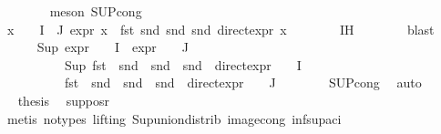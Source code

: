 \begin{isabellebody}
\ \ \ \ \ \ \isamarkupfalse%
\ {\isacharparenleft}{\kern0pt}meson\ SUP{\isacharunderscore}{\kern0pt}cong{\isacharparenright}{\kern0pt}\isanewline
\ \ \ \ \isamarkupfalse%
\ {\isachardoublequoteopen}{\isasymforall}x\ {\isasymin}\ {\isasymPhi}\ {\isacharbackquote}{\kern0pt}\ {\isacharparenleft}{\kern0pt}I\ {\isasymunion}\ J{\isacharparenright}{\kern0pt}{\isachardot}{\kern0pt}\ expr{\isacharunderscore}{\kern0pt}{}\ x\ {\isacharequal}{\kern0pt}\ fst\ {\isacharparenleft}{\kern0pt}snd\ {\isacharparenleft}{\kern0pt}snd\ {\isacharparenleft}{\kern0pt}snd\ {\isacharparenleft}{\kern0pt}direct{\isacharunderscore}{\kern0pt}expr\ x{\isacharparenright}{\kern0pt}{\isacharparenright}{\kern0pt}{\isacharparenright}{\kern0pt}{\isacharparenright}{\kern0pt}{\isachardoublequoteclose}\isanewline
\ \ \ \ \ \ \isamarkupfalse%
\ IH\isanewline
\ \ \ \ \ \ \isamarkupfalse%
\ blast{\isacharplus}{\kern0pt}\isanewline
\ \ \ \ \isamarkupfalse%
\ {\isachardoublequoteopen}Sup\ {\isacharparenleft}{\kern0pt}{\isacharparenleft}{\kern0pt}expr{\isacharunderscore}{\kern0pt}{}\ {\isasymcirc}\ {\isasymPhi}{\isacharparenright}{\kern0pt}\ {\isacharbackquote}{\kern0pt}\ I\ {\isasymunion}\ {\isacharparenleft}{\kern0pt}expr{\isacharunderscore}{\kern0pt}{}\ {\isasymcirc}\ {\isasymPhi}{\isacharparenright}{\kern0pt}\ {\isacharbackquote}{\kern0pt}\ J{\isacharparenright}{\kern0pt}\ {\isacharequal}{\kern0pt}\ \isanewline
\ \ \ \ \ \ \ \ \ \ Sup\ {\isacharparenleft}{\kern0pt}{\isacharparenleft}{\kern0pt}fst\ {\isasymcirc}\ snd\ {\isasymcirc}\ snd\ {\isasymcirc}\ snd\ {\isasymcirc}\ direct{\isacharunderscore}{\kern0pt}expr\ {\isasymcirc}\ {\isasymPhi}{\isacharparenright}{\kern0pt}\ {\isacharbackquote}{\kern0pt}\ I\ {\isasymunion}\isanewline
\ \ \ \ \ \ \ \ \ \ {\isacharparenleft}{\kern0pt}fst\ {\isasymcirc}\ snd\ {\isasymcirc}\ snd\ {\isasymcirc}\ snd\ {\isasymcirc}\ direct{\isacharunderscore}{\kern0pt}expr\ {\isasymcirc}\ {\isasymPhi}{\isacharparenright}{\kern0pt}\ {\isacharbackquote}{\kern0pt}\ J{\isacharparenright}{\kern0pt}{\isachardoublequoteclose}\isanewline
\ \ \ \ \ \ \isamarkupfalse%
\ SUP{\isacharunderscore}{\kern0pt}cong\ \isamarkupfalse%
\ auto\isanewline
\ \ \ \ \isamarkupfalse%
\ \isamarkupfalse%
\ {\isacharquery}{\kern0pt}thesis\ \isamarkupfalse%
\ sup{\isacharunderscore}{\kern0pt}pos{\isacharunderscore}{\kern0pt}r\ \isanewline
\ \ \ \ \ \ \isamarkupfalse%
\ {\isacharparenleft}{\kern0pt}metis\ {\isacharparenleft}{\kern0pt}no{\isacharunderscore}{\kern0pt}types{\isacharcomma}{\kern0pt}\ lifting{\isacharparenright}{\kern0pt}\ Sup{\isacharunderscore}{\kern0pt}union{\isacharunderscore}{\kern0pt}distrib\ image{\isacharunderscore}{\kern0pt}cong\ inf{\isacharunderscore}{\kern0pt}sup{\isacharunderscore}{\kern0pt}aci{\isacharparenleft}{\kern0pt}{}{\isacharparenright}{\kern0pt}{\isacharparenright}{\kern0pt}\isanewline

\end{isabellebody}
